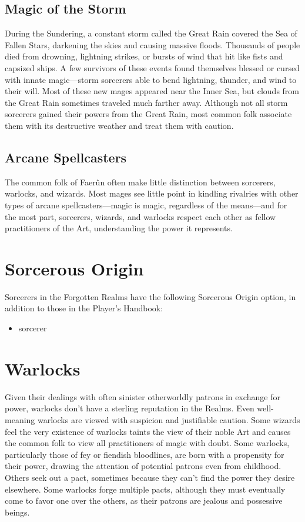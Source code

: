 \documentclass[10pt,a4paper,twoside,twocolumn,openany,bg=print,nodeprecatedcode]{dndbook}
\begin{document}
\subsection{Magic of the Storm}
During the Sundering, a constant storm called the Great Rain covered the Sea of Fallen Stars, darkening the skies and causing massive floods. Thousands of people died from drowning, lightning strikes, or bursts of wind that hit like fists and capsized ships. A few survivors of these events found themselves blessed or cursed with innate magic—storm sorcerers able to bend lightning, thunder, and wind to their will. Most of these new mages appeared near the Inner Sea, but clouds from the Great Rain sometimes traveled much farther away. Although not all storm sorcerers gained their powers from the Great Rain, most common folk associate them with its destructive weather and treat them with caution.
\subsection{Arcane Spellcasters}
The common folk of Faerûn often make little distinction between sorcerers, warlocks, and wizards. Most mages see little point in kindling rivalries with other types of arcane spellcasters—magic is magic, regardless of the means—and for the most part, sorcerers, wizards, and warlocks respect each other as fellow practitioners of the Art, understanding the power it represents.
\section{Sorcerous Origin}
Sorcerers in the Forgotten Realms have the following Sorcerous Origin option, in addition to those in the Player's Handbook:

\begin{itemize}
\item sorcerer
\end{itemize}

\section{Warlocks}
Given their dealings with often sinister otherworldly patrons in exchange for power, warlocks don't have a sterling reputation in the Realms. Even well-meaning warlocks are viewed with suspicion and justifiable caution. Some wizards feel the very existence of warlocks taints the view of their noble Art and causes the common folk to view all practitioners of magic with doubt.
Some warlocks, particularly those of fey or fiendish bloodlines, are born with a propensity for their power, drawing the attention of potential patrons even from childhood. Others seek out a pact, sometimes because they can't find the power they desire elsewhere. Some warlocks forge multiple pacts, although they must eventually come to favor one over the others, as their patrons are jealous and possessive beings.
\end{document}
